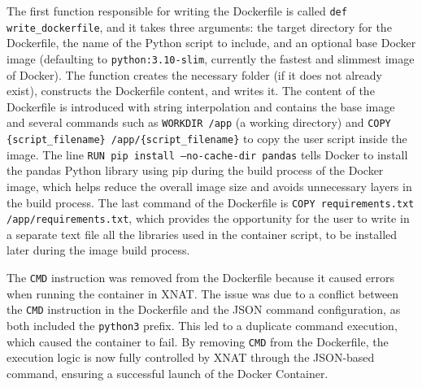 The first function responsible for writing the Dockerfile is called \texttt{def write\_dockerfile}, and it takes three arguments: the target directory for the Dockerfile, the name of the Python script to include, and an optional base Docker image (defaulting to \texttt{python:3.10-slim}, currently the fastest and slimmest image of Docker). The function creates the necessary folder (if it does not already exist), constructs the Dockerfile content, and writes it. The content of the Dockerfile is introduced with string interpolation and contains the base image and several commands such as \texttt{WORKDIR /app} (a working directory) and \texttt{COPY \{script\_filename\} /app/\{script\_filename\}} to copy the user script inside the image. The line \texttt{RUN pip install --no-cache-dir pandas} tells Docker to install the pandas Python library using pip during the build process of the Docker image, which helps reduce the overall image size and avoids unnecessary layers in the build process. The last command of the Dockerfile is \texttt{COPY requirements.txt /app/requirements.txt}, which provides the opportunity for the user to write in a separate text file all the libraries used in the container script, to be installed later during the image build process.


The \texttt{CMD} instruction was removed from the Dockerfile because it caused errors when running the container in XNAT. The issue was due to a conflict between the \texttt{CMD} instruction in the Dockerfile and the JSON command configuration, as both included the \texttt{python3} prefix. This led to a duplicate command execution, which caused the container to fail. By removing \texttt{CMD} from the Dockerfile, the execution logic is now fully controlled by XNAT through the JSON-based command, ensuring a successful launch of the Docker Container.



\lstset{style=allblack}



\lstset{inputpath=en/content}



